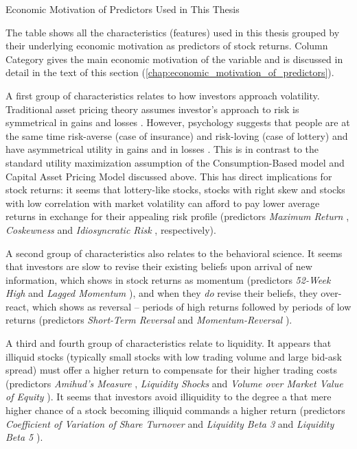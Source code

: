 			\begin{table}
				\resizebox{\textwidth}{!}{}
				\caption{Economic Motivation of Predictors Used in This Thesis}
				\label{tab:characteristics_motivation}
				\medskip
				\small 
				The table shows all the characteristics (features) used in this thesis grouped by their underlying economic motivation as predictors of stock returns. Column Category gives the main economic motivation of the variable and is discussed in detail in the text of this section (\ref{chap:economic_motivation_of_predictors}). 
			\end{table}
			
			A first group of characteristics relates to how investors approach volatility. Traditional asset pricing theory assumes investor's approach to risk is symmetrical in gains and losses \citep{cochrane2009asset}. However, psychology suggests that people are at the same time risk-averse (case of insurance) and risk-loving (case of lottery) and have asymmetrical utility in gains and in losses \citep{kahneman2013prospect}. This is in contrast to the standard utility maximization assumption of the Consumption-Based model and Capital Asset Pricing Model discussed above. This has direct implications for stock returns: it seems that lottery-like stocks, stocks with right skew and stocks with low correlation with market volatility can afford to pay lower average returns in exchange for their appealing risk profile (predictors \textit{Maximum Return} \citep{bali2011maxing}, \textit{Coskewness} \citep{harvey2000conditional} and \textit{Idiosyncratic Risk} \citep{ang2006cross}, respectively).
			
			A second group of characteristics also relates to the behavioral science. It seems that investors are slow to revise their existing beliefs upon arrival of new information, which shows in stock returns as momentum (predictors \textit{52-Week High} \citep{george200452} and \textit{Lagged Momentum} \citep{novy2012momentum}), and when they \textit{do} revise their beliefs, they over-react, which shows as reversal -- periods of high returns followed by periods of low returns (predictors \textit{Short-Term Reversal} \citep{jegadeesh1990evidence} and \textit{Momentum-Reversal} \citep{jegadeesh1993returns}). 
			
			A third and fourth group of characteristics relate to liquidity. It appears that illiquid stocks (typically small stocks with low trading volume and large bid-ask spread) must offer a higher return to compensate for their higher trading costs (predictors \textit{Amihud's Measure} \citep{amihud2002illiquidity}, \textit{Liquidity Shocks} \citep{bali2013liquidity} and \textit{Volume over Market Value of Equity}  \citep{haugen1996commonality}). It seems that investors avoid illiquidity to the degree a that mere higher chance of a stock becoming illiquid commands a higher return (predictors \textit{Coefficient of Variation of Share Turnover} \citep{chordia2001trading} and \textit{Liquidity Beta 3} and \textit{Liquidity Beta 5}  \citep{acharya2005asset}).  
			
